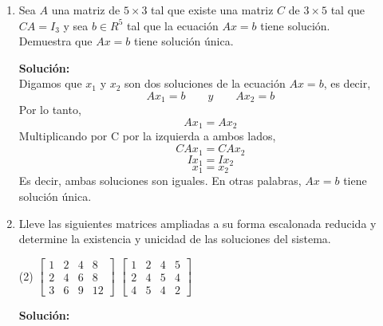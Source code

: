 \documentclass[12pt]{article}
\newenvironment{solucion}
{\begin{mdframed}[backgroundcolor=black!10]
		{\bf Solución:}\\
	}
	{
	\end{mdframed}
}
\newenvironment{preguntas}
{\begin{enumerate}\itemsep12pt
	}
	{
	\end{enumerate}
}
\newcommand{\widesim}[2][1.5]{
	\mathrel{\overset{#2}{\scalebox{#1}[1]{$\sim$}}}
}
\newcommand{\wsim}{\widesim{}}
\begin{document}
\begin{preguntas}
\begin{solucion}
$$\begin{array}{cccc|c}
			-1& 6 & 1 & 5 & 3 \\
			0 & -1 & 5 & 4 &0
		\end{array}
		\right] \stackbin[F_4+F_2]{F_3 +F_1}{\wsim}
		\left[
		\begin{array}{cccc|c}
		1 & -6 & 0 & 0 & 5\\
		0 & 1 & -4 & 1 & 0\\
		0 & 0 & 1 & 5 & 8 \\
		0 & 0 & 1 & 5 & 0
		\end{array}
		\right] \stackbin[]{F_4-F_3}{\wsim}
		\left[
		\begin{array}{cccc|c}
		1 & -6 & 0 & 0 & 5\\
		0 & 1 & -4 & 1 & 0\\
		0 & 0 & 1 & 5 & 8 \\
		0 & 0 & 0 & 0 & -8
		\end{array}
		\right] $$
		Aqui podemos apreciar que en el la última fila, todas las variables tienen coeficiente cero y la columna de coeficientes aumentados tiene valor, lo que no es posible, ya que esto significaría que se cumple la igualdad $0 = -8$, lo que no es cierto. Dicho esto, el sistema no es consistente.
\end{solucion}
\item Sea $A$ una matriz de $5 \times 3$ tal que existe una matriz $C$ de $3 \times 5$ tal que $CA = I_3$ y sea $b \in R^5$ tal que la ecuación $Ax = b$ tiene solución.\\
Demuestra que $Ax = b$ tiene solución única.
\begin{solucion}
Digamos que $x_1$ y $x_2$ son dos soluciones de la ecuación $Ax = b$, es decir,
$$Ax_1 = b \qquad y \qquad Ax_2 = b$$
Por lo tanto,
$$Ax_1 = Ax_2$$
Multiplicando por C por la izquierda a ambos lados,
$$CAx_1 = CAx_2$$
$$Ix_1 = Ix_2$$
$$x_1 = x_2$$
Es decir, ambas soluciones son iguales. En otras palabras, $Ax = b$ tiene solución única.
\end{solucion}
\item Lleve las siguientes matrices ampliadas a su forma escalonada reducida y determine la existencia y unicidad de las soluciones del sistema.
\begin{tasks}(2)
\task $
		\begin{bmatrix}
		1 & 2 & 4 & 8\\
		2 & 4 & 6 & 8\\
		3 & 6 & 9 & 12
		\end{bmatrix}
		$
\task $
		\begin{bmatrix}
		1 & 2 & 4 & 5\\
		2 & 4 & 5& 4\\
		4 & 5 & 4 & 2
		\end{bmatrix}
		$
\end{tasks}
\begin{solucion}


\end{solucion}
\end{preguntas}
\end{document}
